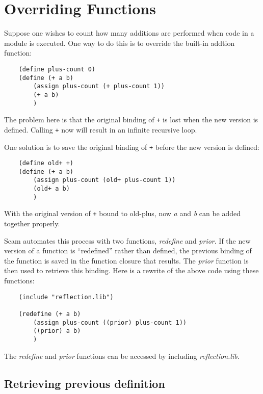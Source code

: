 \chapter{Overriding Functions}
\label{OverridingFunctions}

Suppose one wishes to count how many additions are performed when
code in a module is executed. One way to do this is to override
the built-in addtion function:

\begin{verbatim}
    (define plus-count 0)
    (define (+ a b)
        (assign plus-count (+ plus-count 1))
        (+ a b)
        )
\end{verbatim}

The problem here is that the original binding of \verb!+! is lost when the 
new version is defined.
Calling \verb!+! now will result in an infinite recursive
loop.

One solution is to save the original binding of \verb!+! before the new version
is defined:

\begin{verbatim}
    (define old+ +)
    (define (+ a b)
        (assign plus-count (old+ plus-count 1))
        (old+ a b)
        )
\end{verbatim}

With the original version of \verb!+! bound to old-plus,
now {\it a} and {\it b} can be added
together properly.
    
Scam automates this process with two functions, {\it redefine} and {\it prior}.
If the new version of a function is ``redefined'' rather than defined,
the previous
binding of the function is saved in the function closure that results.
The {\it prior} function 
is then used to retrieve this binding. Here is a rewrite
of the above code using these functions:

\begin{verbatim}
    (include "reflection.lib")

    (redefine (+ a b)
        (assign plus-count ((prior) plus-count 1))
        ((prior) a b)
        )
\end{verbatim}

The {\it redefine} and {\it prior} functions can be accessed by including
{\it reflection.lib}.
    
\section{Retrieving previous definition}

